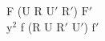 F (U R $\text{U}'$ $\text{R}'$) $\text{F}'$\\
$\text{y}^2$ f (R U $\text{R}'$ $\text{U}'$) $\text{f}'$\\
